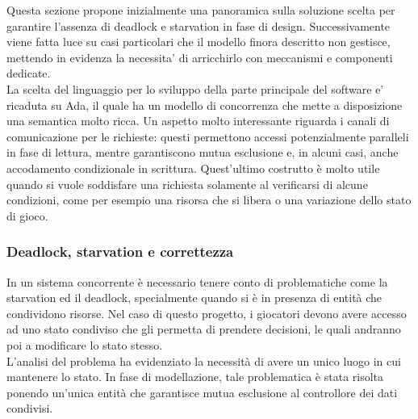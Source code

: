 Questa sezione propone inizialmente una panoramica sulla soluzione scelta per garantire l'assenza di deadlock e starvation in fase di design. Successivamente viene fatta luce su casi particolari che il modello finora descritto non gestisce, mettendo in evidenza la necessita' di arricchirlo con meccanismi e componenti dedicate.\\

La scelta del linguaggio per lo sviluppo della parte principale del software e' ricaduta su Ada, il quale ha un modello di concorrenza che mette a disposizione una semantica molto ricca. Un aspetto molto interessante riguarda i canali di comunicazione per le richieste: questi permettono accessi potenzialmente paralleli in fase di lettura, mentre  garantiscono mutua esclusione e, in alcuni casi, anche accodamento condizionale in scrittura. Quest'ultimo costrutto è molto utile quando si vuole soddisfare una richiesta solamente al verificarsi di alcune condizioni, come per esempio una risorsa che si libera o una variazione dello stato di gioco.

\subsubsection{Deadlock, starvation e correttezza}
\label{sec:analisi_concorrenza_deadlock}

In un sistema concorrente è necessario tenere conto di problematiche come la starvation ed il deadlock, specialmente quando si è in presenza di entità che condividono risorse. Nel caso di questo progetto, i giocatori devono avere accesso ad uno stato condiviso che gli permetta di prendere decisioni, le quali andranno poi a modificare lo stato stesso.\\

L'analisi del problema ha evidenziato la necessità di avere un unico luogo in cui mantenere lo stato. In fase di modellazione, tale problematica è stata risolta ponendo un'unica entità che garantisce mutua esclusione al controllore dei dati condivisi.\\

